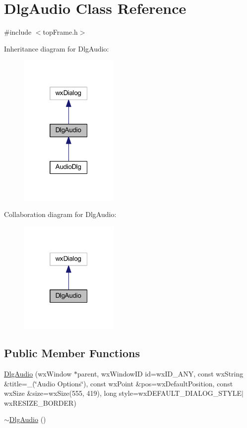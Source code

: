 \hypertarget{class_dlg_audio}{\section{Dlg\-Audio Class Reference}
\label{class_dlg_audio}
}


{\ttfamily \#include $<$top\-Frame.\-h$>$}



Inheritance diagram for Dlg\-Audio\-:\nopagebreak
\begin{figure}[H]
\begin{center}
\leavevmode
\includegraphics[width=136pt]{class_dlg_audio__inherit__graph}
\end{center}
\end{figure}


Collaboration diagram for Dlg\-Audio\-:\nopagebreak
\begin{figure}[H]
\begin{center}
\leavevmode
\includegraphics[width=136pt]{class_dlg_audio__coll__graph}
\end{center}
\end{figure}
\subsection*{Public Member Functions}
\begin{DoxyCompactItemize}
\item 
\hyperlink{class_dlg_audio_a95fa3d4e8550bf2a16b8562c9c518eae}{Dlg\-Audio} (wx\-Window $\ast$parent, wx\-Window\-I\-D id=wx\-I\-D\-\_\-\-A\-N\-Y, const wx\-String \&title=\-\_\-(\char`\"{}Audio Options\char`\"{}), const wx\-Point \&pos=wx\-Default\-Position, const wx\-Size \&size=wx\-Size(555, 419), long style=wx\-D\-E\-F\-A\-U\-L\-T\-\_\-\-D\-I\-A\-L\-O\-G\-\_\-\-S\-T\-Y\-L\-E$|$wx\-R\-E\-S\-I\-Z\-E\-\_\-\-B\-O\-R\-D\-E\-R)
\item 
\hyperlink{class_dlg_audio_a9fd881146206d865e894b6c13faf4b1f}{$\sim$\-Dlg\-Audio} ()
\end{DoxyCompactItemize}
